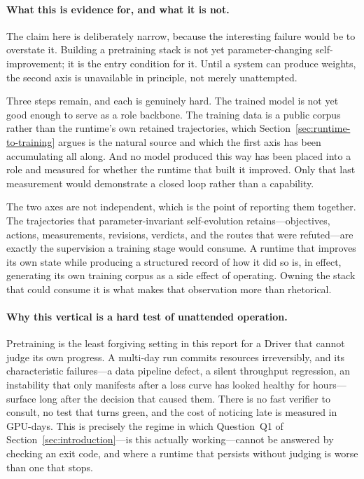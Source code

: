 \paragraph{What this is evidence for, and what it is not.}
The claim here is deliberately narrow, because the interesting failure would be to
overstate it. Building a pretraining stack is not yet parameter-changing
self-improvement; it is the entry condition for it. Until a system can produce
weights, the second axis is unavailable in principle, not merely unattempted.

Three steps remain, and each is genuinely hard. The trained model is not yet good
enough to serve as a role backbone. The training data is a public corpus rather than
the runtime's own retained trajectories, which
Section~\ref{sec:runtime-to-training} argues is the natural source and which the
first axis has been accumulating all along. And no model produced this way has been
placed into a role and measured for whether the runtime that built it improved. Only
that last measurement would demonstrate a closed loop rather than a capability.

The two axes are not independent, which is the point of reporting them together. The
trajectories that parameter-invariant self-evolution retains---objectives, actions,
measurements, revisions, verdicts, and the routes that were refuted---are exactly the
supervision a training stage would consume. A runtime that improves its own state
while producing a structured record of how it did so is, in effect, generating its
own training corpus as a side effect of operating. Owning the stack that could
consume it is what makes that observation more than rhetorical.

\paragraph{Why this vertical is a hard test of unattended operation.}
Pretraining is the least forgiving setting in this report for a Driver that cannot
judge its own progress. A multi-day run commits resources irreversibly, and its
characteristic failures---a data pipeline defect, a silent throughput regression, an
instability that only manifests after a loss curve has looked healthy for
hours---surface long after the decision that caused them. There is no fast verifier
to consult, no test that turns green, and the cost of noticing late is measured in
GPU-days. This is precisely the regime in which Question~Q1 of
Section~\ref{sec:introduction}---is this actually working---cannot be answered by
checking an exit code, and where a runtime that persists without judging is worse
than one that stops.
